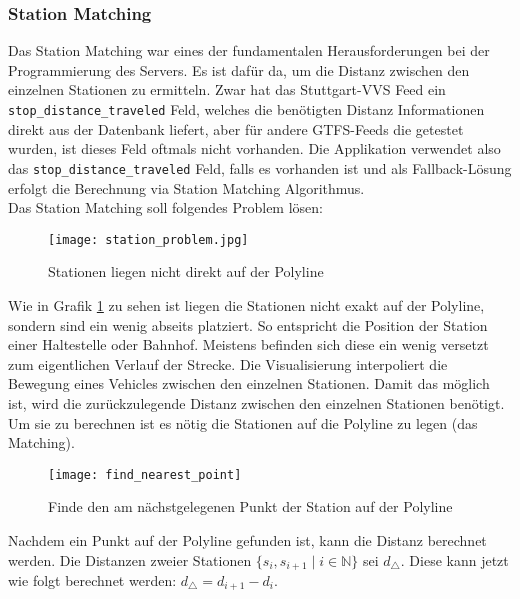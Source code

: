 \subsubsection*{Station Matching}
\label{ssub:station_matching}

  Das Station Matching war eines der fundamentalen Herausforderungen bei der Programmierung des Servers. Es ist dafür da, um die Distanz zwischen den einzelnen Stationen zu ermitteln. Zwar hat das Stuttgart-VVS Feed ein \texttt{stop\_distance\_traveled} Feld, welches die benötigten Distanz Informationen direkt aus der Datenbank liefert, aber für andere GTFS-Feeds die getestet wurden, ist dieses Feld oftmals nicht vorhanden. Die Applikation verwendet also das \texttt{stop\_distance\_traveled} Feld, falls es vorhanden ist und als Fallback-Lösung erfolgt die Berechnung via Station Matching Algorithmus.\\

  Das Station Matching soll folgendes Problem lösen:

  \begin{figure}[htbp]
    \begin{center}
      \texttt{[image: station\_problem.jpg]}
      \caption{Stationen liegen nicht direkt auf der Polyline}
      \label{fig:station_problem}
    \end{center}
  \end{figure}
  
  Wie in Grafik \ref{fig:station_problem} zu sehen ist liegen die Stationen nicht exakt auf der Polyline, sondern sind ein wenig abseits platziert. So entspricht die Position der Station einer Haltestelle oder Bahnhof. Meistens befinden sich diese ein wenig versetzt zum eigentlichen Verlauf der Strecke. Die Visualisierung interpoliert die Bewegung eines Vehicles zwischen den einzelnen Stationen. Damit das möglich ist, wird die zurückzulegende Distanz zwischen den einzelnen Stationen benötigt. Um sie zu berechnen ist es nötig die Stationen auf die Polyline zu legen (das Matching).

  \begin{figure}[htbp]
    \begin{center}
      \texttt{[image: find\_nearest\_point]}
      \caption{Finde den am nächstgelegenen Punkt der Station auf der Polyline}
      \label{fig:find_nearest_point}
    \end{center}
  \end{figure}

  Nachdem ein Punkt auf der Polyline gefunden ist, kann die Distanz berechnet werden. Die Distanzen zweier Stationen $\{s_i,s_{i+1} \;|\; i \in \mathbb{N} \}$ sei $d_\triangle$. Diese kann jetzt wie folgt berechnet werden: $ d_\triangle = d_{i+1} - d_i$. 

